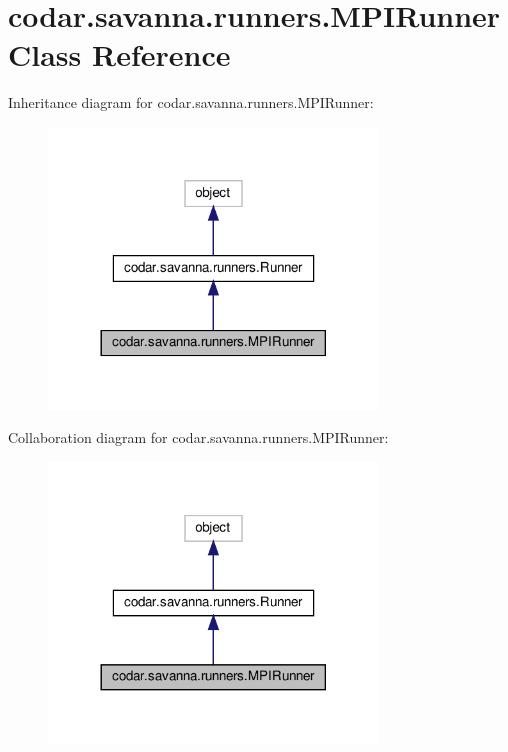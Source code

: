 \hypertarget{classcodar_1_1savanna_1_1runners_1_1_m_p_i_runner}{}\section{codar.\+savanna.\+runners.\+M\+P\+I\+Runner Class Reference}
\label{classcodar_1_1savanna_1_1runners_1_1_m_p_i_runner}


Inheritance diagram for codar.\+savanna.\+runners.\+M\+P\+I\+Runner\+:
\nopagebreak
\begin{figure}[H]
\begin{center}
\leavevmode
\includegraphics[width=248pt]{classcodar_1_1savanna_1_1runners_1_1_m_p_i_runner__inherit__graph}
\end{center}
\end{figure}


Collaboration diagram for codar.\+savanna.\+runners.\+M\+P\+I\+Runner\+:
\nopagebreak
\begin{figure}[H]
\begin{center}
\leavevmode
\includegraphics[width=248pt]{classcodar_1_1savanna_1_1runners_1_1_m_p_i_runner__coll__graph}
\end{center}
\end{figure}
